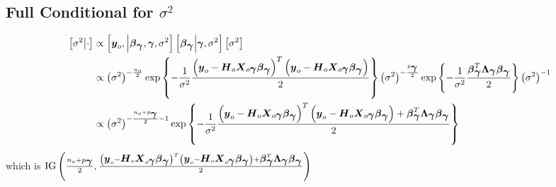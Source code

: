 \documentclass[fleqn]{article}
\def\bm#1{\mbox{\boldmath $#1$}}
\begin{document}
\subsection{Full Conditional for $\sigma^2$}
%
\begin{align*}
%
\left[ \sigma^2 \middle| \cdot \right] & \propto \left[ \bm{y}_o, \middle| \bm{\beta}_{\bm{\gamma}}, \bm{\gamma}, \sigma^2 \right] \left[ \bm{\beta}_{\bm{\gamma}} \middle| \bm{\gamma}, \sigma^2 \right] \left[ \sigma^2 \right] \\
%
 & \propto \left( \sigma^2 \right)^{ - \frac{n_o} {2}} \exp{\left\{ - \frac{1} {\sigma^2} \frac{ \left( \bm{y}_o - \bm{H}_o \bm{X}_{o \bm{\gamma}} \bm{\beta}_{\bm{\gamma}} \right)^T \left( \bm{y}_o - \bm{H}_o \bm{X}_{o \bm{\gamma}} \bm{\beta}_{\bm{\gamma}} \right) } {2} \right\} } \left( \sigma^2 \right)^{ - \frac{p_{\bm{\gamma}}} {2}} \exp{ \left\{ - \frac{1} {\sigma^2} \frac{\bm{\beta}_{\bm{\gamma}}^T \bm{\Lambda}_{\bm{\gamma}} \bm{\beta}_{\bm{\gamma}}} {2} \right\} } \left( \sigma^2 \right)^{ - 1}\\
%
 & \propto \left( \sigma^2 \right)^{ - \frac{n_o + p_{\bm{\gamma}}} {2} - 1} \exp{\left\{ - \frac{1} {\sigma^2} \frac{ \left( \bm{y}_o - \bm{H}_o \bm{X}_{o \bm{\gamma}} \bm{\beta}_{\bm{\gamma}} \right)^T \left( \bm{y}_o - \bm{H}_o \bm{X}_{o \bm{\gamma}} \bm{\beta}_{\bm{\gamma}} \right) + \bm{\beta}_{\bm{\gamma}}^T \bm{\Lambda}_{\bm{\gamma}} \bm{\beta}_{\bm{\gamma}} } {2} \right\} } 
%
\end{align*}
%
which is $\mbox{IG} \left( \frac{n_o + p_{\bm{\gamma}}} {2}, \frac{\left( \bm{y}_o - \bm{H}_o \bm{X}_{o \bm{\gamma}} \bm{\beta}_{\bm{\gamma}} \right)^T \left( \bm{y}_o - \bm{H}_o \bm{X}_{o \bm{\gamma}} \bm{\beta}_{\bm{\gamma}} \right) + \bm{\beta}_{\bm{\gamma}}^T \bm{\Lambda}_{\bm{\gamma}} \bm{\beta}_{\bm{\gamma}}} {2} \right)$
\end{document}

